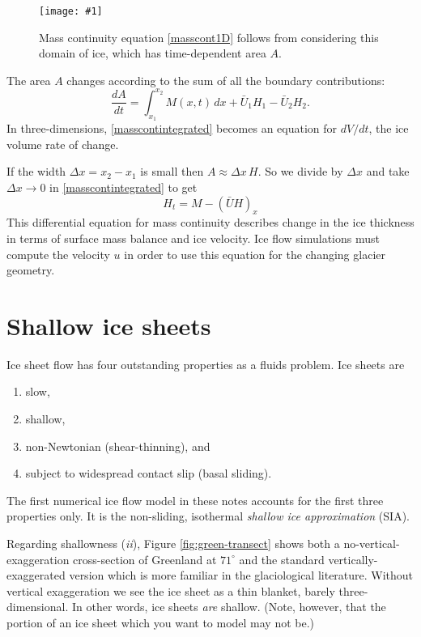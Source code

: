 \documentclass[letterpaper,final,12pt,reqno]{amsart}
\newcommand{\onefigsize}[3]{
\begin{figure}[ht]
\centering
\texttt{[image: \#1]}
\caption{#2}
\label{fig:#1}
\end{figure}}
\begin{document}
\onefigsize{slabmasscontfig}{Mass continuity equation \eqref{masscont1D} follows from considering this domain of ice, which has time-dependent area $A$.}{2.5in}

The area $A$ changes according to the sum of all the boundary contributions:
\begin{equation}
\frac{dA}{dt} = \int_{x_1}^{x_2} M(x,t)\,dx + \bar U_1 H_1 - \bar U_2 H_2. \label{masscontintegrated}
\end{equation}
In three-dimensions, \eqref{masscontintegrated} becomes an equation for $dV/dt$, the ice volume rate of change.

If the width $\Delta x=x_2-x_1$ is small then $A\approx \Delta x\, H$.  So we divide by $\Delta x$ and take $\Delta x \to 0$ in \eqref{masscontintegrated} to get
\begin{equation}
H_t = M - \left(\bar U H\right)_x \label{masscont1D}
\end{equation}
This differential equation for mass continuity describes change in the ice thickness in terms of surface mass balance and ice velocity.  Ice flow simulations must compute the velocity $u$ in order to use this equation for the changing glacier geometry.


\section{Shallow ice sheets}   \label{sec:sia}

Ice sheet flow has four outstanding properties as a fluids problem.  Ice sheets are
\renewcommand{\labelenumi}{(\emph{\roman{enumi}})}
\begin{enumerate}
\item slow,
\item shallow,
\item non-Newtonian (shear-thinning), and
\item subject to widespread contact slip (basal sliding).
\end{enumerate}
The first numerical ice flow model in these notes accounts for the first three properties only.  It is the non-sliding, isothermal \emph{shallow ice approximation} (SIA).

Regarding shallowness (\emph{ii}), Figure \ref{fig:green-transect} shows both a no-vertical-exaggeration cross-section of Greenland at $71^\circ$ and the standard vertically-exaggerated version which is more familiar in the glaciological literature.  Without vertical exaggeration we see the ice sheet as a thin blanket, barely three-dimensional.  In other words, ice sheets \emph{are} shallow.  (Note, however, that the portion of an ice sheet which you want to model may not be.)
\end{document}
